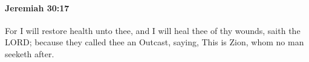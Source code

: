 
		\paragraph{Jeremiah 30:17} %
			\label{JEREMIAH-30-17}

			For I will restore health unto thee, and I will heal thee of thy wounds, saith the LORD; because they called thee an Outcast, saying, This is Zion, whom no man seeketh after.


